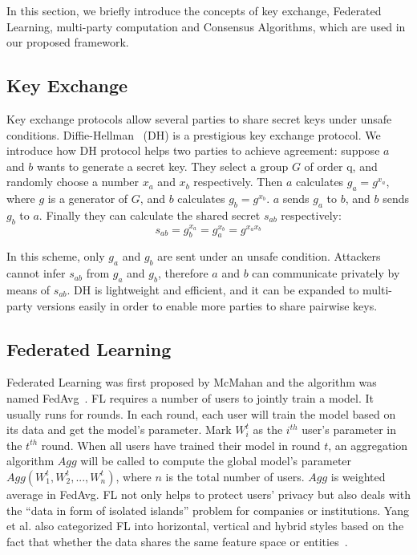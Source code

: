 In this section, we briefly introduce the concepts of key exchange, Federated Learning, multi-party computation and Consensus Algorithms, which are used in our proposed framework.

\subsection{Key Exchange}
Key exchange protocols allow several parties to share secret keys under unsafe conditions. Diffie-Hellman~\cite{DH} (DH) is a prestigious key exchange protocol. We introduce how DH protocol helps two parties to achieve agreement: suppose $a$ and $b$ wants to generate a secret key. They select a group $G$ of order q, and randomly choose a number $x_a$ and $x_b$ respectively. Then $a$ calculates $g_a = g^{x_a}$, where $g$ is a generator of $G$, and $b$ calculates $g_b = g^{x_b}$. $a$ sends $g_a$ to $b$, and $b$ sends $g_b$ to $a$. Finally they can calculate the shared secret $s_{ab}$ respectively:
$$ s_{ab} = g_b^{x_a}  = g_a^{x_b} = g^{x_ax_b}$$

In this scheme, only $g_a$ and $g_b$ are sent under an unsafe condition. Attackers cannot infer $s_{ab}$ from $g_a$ and $g_b$, therefore $a$ and $b$ can communicate privately by means of $s_{ab}$. DH is lightweight and efficient, and it can be expanded to multi-party versions easily in order to enable more parties to share pairwise keys.


\subsection{Federated Learning}
Federated Learning was first proposed by McMahan and the algorithm was named FedAvg~\cite{mcmahan2016communicationefficient}. FL requires a number of users to jointly train a model. It usually runs for rounds. In each round, each user will train the model based on its data and get the model's parameter. Mark $W_i^t$ as the $i^{th}$ user's parameter in the $t^{th}$ round. When all users have trained their model in round $t$, an aggregation algorithm $Agg$ will be called to compute the global model's parameter $Agg(W_1^t, W_2^t, ..., W_n^t)$, where $n$ is the total number of users. $Agg$ is weighted average in FedAvg. FL not only helps to protect users' privacy but also deals with the ``data in form of isolated islands'' problem for companies or institutions. Yang et al. also categorized FL into horizontal, vertical and hybrid styles based on the fact that whether the data shares the same feature space or entities~\cite{yang2019federated}. 

